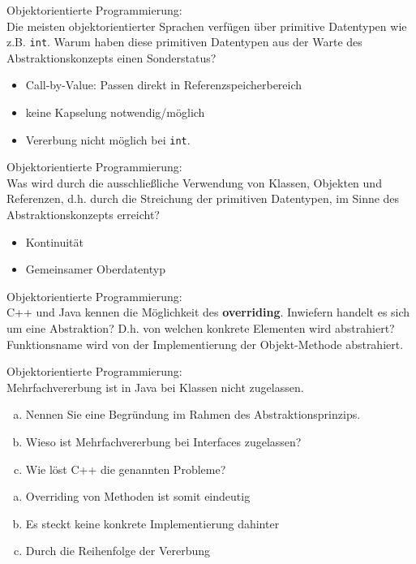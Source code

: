 \begin{card}
	Objektorientierte Programmierung:\\
	Die meisten objektorientierter Sprachen verfügen über primitive Datentypen wie z.B. \texttt{int}. Warum haben diese primitiven Datentypen aus der Warte des Abstraktionskonzepts einen Sonderstatus?
	\hr
	\begin{itemize}
	\item Call-by-Value: Passen direkt in Referenzspeicherbereich
	\item keine Kapselung notwendig/möglich
	\item Vererbung nicht möglich bei \texttt{int}.
	\end{itemize}
\end{card}

\begin{card}
	Objektorientierte Programmierung:\\
	Was wird durch die ausschließliche Verwendung von Klassen, Objekten und Referenzen, d.h. durch die Streichung der primitiven Datentypen, im Sinne des Abstraktionskonzepts erreicht?
	\hr
	\begin{itemize}
	\item Kontinuität
	\item Gemeinsamer Oberdatentyp
	\end{itemize}
\end{card}

\begin{card}
	Objektorientierte Programmierung:\\
	C++ und Java kennen die Möglichkeit des \textbf{overriding}. Inwiefern handelt es sich um eine Abstraktion? D.h. von welchen konkrete Elementen wird abstrahiert? 
	\hr
	Funktionsname wird von der Implementierung der Objekt-Methode abstrahiert.
\end{card}

\begin{card}
	Objektorientierte Programmierung:\\
	Mehrfachvererbung ist in Java bei Klassen nicht zugelassen. 
	\begin{enumerate}[a)]
	\item Nennen Sie eine Begründung im Rahmen des Abstraktionsprinzips.
	\item Wieso ist Mehrfachvererbung bei Interfaces zugelassen?
	\item Wie löst C++ die genannten Probleme?
	\end{enumerate}
	\hr
	\begin{enumerate}[a)]
	\item Overriding von Methoden ist somit eindeutig
	\item Es steckt keine konkrete Implementierung dahinter
	\item Durch die Reihenfolge der Vererbung
	\end{enumerate}
\end{card}

